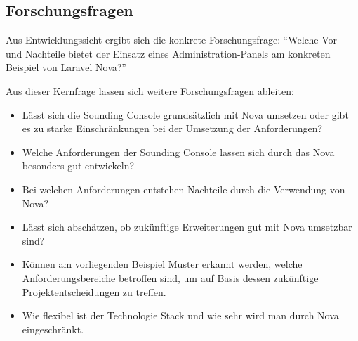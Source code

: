 \subsection{Forschungsfragen}
Aus Entwicklungssicht ergibt sich die konkrete Forschungsfrage:
\enquote{Welche Vor- und Nachteile bietet der Einsatz eines Administration-Panels am konkreten Beispiel von Laravel Nova?}

Aus dieser Kernfrage lassen sich weitere Forschungsfragen ableiten:
\begin{itemize}
    \item Lässt sich die Sounding Console grundsätzlich mit Nova umsetzen oder gibt es zu starke Einschränkungen bei der Umsetzung der Anforderungen?
    \item Welche Anforderungen der Sounding Console lassen sich durch das Nova besonders gut entwickeln?
    \item Bei welchen Anforderungen entstehen Nachteile durch die Verwendung von Nova?
    \item Lässt sich abschätzen, ob zukünftige Erweiterungen gut mit Nova umsetzbar sind?
    \item Können am vorliegenden Beispiel Muster erkannt werden, welche Anforderungsbereiche betroffen sind, um auf Basis dessen zukünftige Projektentscheidungen zu treffen.
    \item Wie flexibel ist der Technologie Stack und wie sehr wird man durch Nova eingeschränkt.
\end{itemize}
